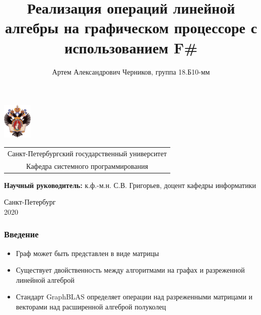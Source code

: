 \documentclass{beamer}
\title[GraphBLAS F\#]{Реализация операций линейной алгебры на графическом процессоре с использованием F\#}
\institute[СПбГУ]{}
\author[Артем Черников]{Артем Александрович Черников, группа 18.Б10-мм}
\begin{document}
{
\begin{frame}
  \includegraphics[width=1.4cm]{pictures/SPbGU_Logo.png}
\vspace{-35pt}
\hspace{-10pt}
\begin{center}
   \begin{tabular}{c}
        \scriptsize{Санкт-Петербургский государственный университет} \\
        \scriptsize{Кафедра системного программирования}
    \end{tabular}
\titlepage
\end{center}

\btVFill

{\scriptsize
   {\bfseries Научный руководитель:} к.ф.-м.н. С.В. Григорьев, доцент кафедры информатики \\  
}
\begin{center}
  \vspace{5pt}
  \scriptsize{Санкт-Петербург\\
                 2020}
  \end{center}

\end{frame}
}

\begin{frame}[fragile]  
  \frametitle{Введение}
  \begin{itemize}
    \item Граф может быть представлен в виде матрицы
    \item Существует двойственность между алгоритмами на графах и разреженной линейной алгеброй
    \item Стандарт GraphBLAS определяет операции над разреженными матрицами и векторами над расширенной алгеброй полуколец
  \end{itemize}
\end{frame}
\end{document}

